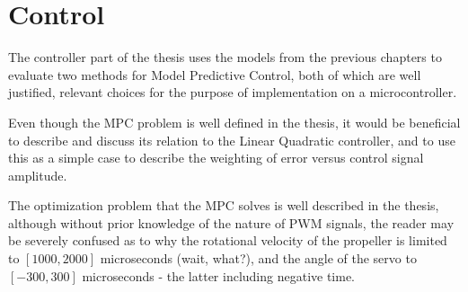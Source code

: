 \section{Control}
\label{sec:control}
	The controller part of the thesis uses the models
	from the previous chapters to evaluate two methods for 
	Model Predictive Control, both of which are well justified, relevant 
	choices for the purpose of implementation on a microcontroller.

	Even though the MPC problem is well defined in the thesis, it would be 
	beneficial to describe and discuss its relation to the Linear Quadratic 
	controller, and to use this as a simple case to describe the weighting
	of error versus control signal amplitude.
	
	The optimization problem that the MPC solves is well described in the
	thesis, although without prior knowledge of the nature of PWM signals, 
	the reader may be severely confused as to why the rotational velocity
	of the propeller is limited to $[1000,2000]$ microseconds (wait, what?),
	and the angle of the servo to $[-300,300]$ microseconds - the latter 
	including negative time.
